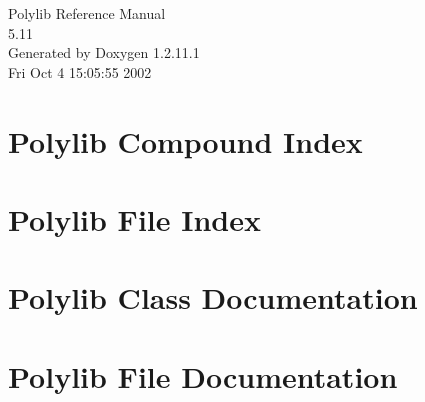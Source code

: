 \documentclass[a4paper]{book}
\begin{document}
\begin{titlepage}
\vspace*{7cm}
\begin{center}
{\Large Polylib Reference Manual\\[1ex]\large 5.11}\\
\vspace*{1cm}
{\large Generated by Doxygen 1.2.11.1}\\
\vspace*{0.5cm}
{\small Fri Oct 4 15:05:55 2002}\\
\end{center}
\end{titlepage}
\clearemptydoublepage
{}
\tableofcontents
\clearemptydoublepage
{}
\chapter{Polylib Compound Index}

\chapter{Polylib File Index}

\chapter{Polylib Class Documentation}





\chapter{Polylib File Documentation}






































\printindex
\end{document}
